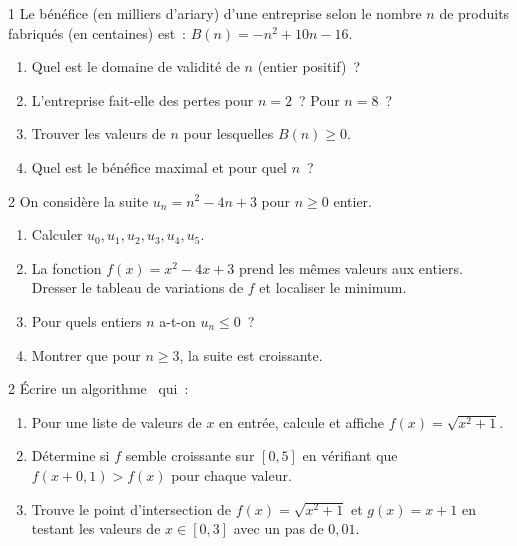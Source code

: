 \begin{probleme}{1}
Le b\'en\'efice (en milliers d'ariary) d'une entreprise selon le nombre
$n$ de produits fabriqu\'es (en centaines) est~:
$B(n) = -n^2 + 10n - 16$.
\begin{enumerate}
  \item Quel est le domaine de validit\'e de $n$ (entier positif)~?
  \item L'entreprise fait-elle des pertes pour $n=2$~? Pour $n=8$~?
  \item Trouver les valeurs de $n$ pour lesquelles $B(n)\geq0$.
  \item Quel est le b\'en\'efice maximal et pour quel $n$~?
\end{enumerate}
\end{probleme}

\begin{probleme}{2}
On consid\`ere la suite $u_n = n^2 - 4n + 3$ pour $n\geq0$ entier.
\begin{enumerate}
  \item Calculer $u_0, u_1, u_2, u_3, u_4, u_5$.
  \item La fonction $f(x)=x^2-4x+3$ prend les m\^emes valeurs aux entiers.
        Dresser le tableau de variations de $f$ et localiser le minimum.
  \item Pour quels entiers $n$ a-t-on $u_n\leq0$~?
  \item Montrer que pour $n\geq3$, la suite est croissante.
\end{enumerate}
\end{probleme}

\begin{probleme}{2}
\'Ecrire un algorithme \computer\ qui~:
\begin{enumerate}
  \item Pour une liste de valeurs de $x$ en entr\'ee, calcule et affiche
        $f(x)=\sqrt{x^2+1}$.
  \item D\'etermine si $f$ semble croissante sur $[0,5]$ en
        v\'erifiant que $f(x+0{,}1)>f(x)$ pour chaque valeur.
  \item Trouve le point d'intersection de $f(x)=\sqrt{x^2+1}$
        et $g(x)=x+1$ en testant les valeurs de $x\in[0,3]$ avec un pas de $0{,}01$.
\end{enumerate}
\end{probleme}

